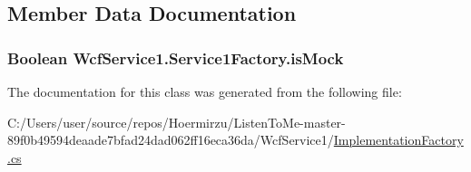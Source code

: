 \subsection{Member Data Documentation}
\subsubsection[{\texorpdfstring{is\+Mock}{isMock}}]{\setlength{\rightskip}{0pt plus 5cm}Boolean Wcf\+Service1.\+Service1\+Factory.\+is\+Mock\hspace{0.3cm}{\ttfamily [private]}}\hypertarget{class_wcf_service1_1_1_service1_factory_acc8fbf60ae4102452ad90ca06b8ffc45}{}\label{class_wcf_service1_1_1_service1_factory_acc8fbf60ae4102452ad90ca06b8ffc45}


The documentation for this class was generated from the following file\+:\begin{DoxyCompactItemize}
\item 
C\+:/\+Users/user/source/repos/\+Hoermirzu/\+Listen\+To\+Me-\/master-\/89f0b49594deaade7bfad24dad062ff16eca36da/\+Wcf\+Service1/\hyperlink{_implementation_factory_8cs}{Implementation\+Factory.\+cs}\end{DoxyCompactItemize}

